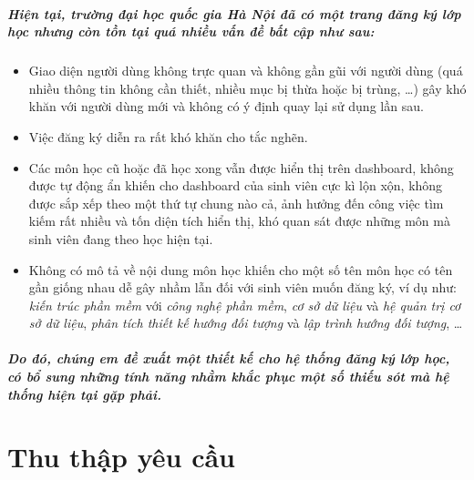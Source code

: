 \documentclass[12pt]{book}
\begin{document}
  \paragraph{\textnormal{Hiện tại, trường đại học quốc gia Hà Nội đã có một trang đăng ký lớp học nhưng còn tồn tại quá nhiều vấn đề bất cập như sau:}}
  \begin{itemize}
    \item Giao diện người dùng không trực quan và không gần gũi với người dùng (quá nhiều thông tin không cần thiết, nhiều mục bị thừa hoặc bị trùng, \ldots) gây khó khăn với người dùng mới và không có ý định quay lại sử dụng lần sau.
    \item Việc đăng ký diễn ra rất khó khăn cho tắc nghẽn.
    \item Các môn học cũ hoặc đã học xong vẫn được hiển thị trên dashboard, không được tự động ẩn khiến cho dashboard của sinh viên cực kì lộn xộn, không được sắp xếp theo một thứ tự chung nào cả, ảnh hưởng đến công việc tìm kiếm rất nhiều và tốn diện tích hiển thị, khó quan sát được những môn mà sinh viên đang theo học hiện tại.
    \item Không có mô tả về nội dung môn học khiến cho một số tên môn học có tên gần giống nhau dễ gây nhầm lẫn đối với sinh viên muốn đăng ký, ví dụ như: \textit{kiến trúc phần mềm} với \textit{công nghệ phần mềm}, \textit{cơ sở dữ liệu} và \textit{hệ quản trị cơ sở dữ liệu}, \textit{phân tích thiết kế hướng đối tượng} và \textit{lập trình hướng đối tượng}, \ldots
  \end{itemize}

  \paragraph{\textnormal{Do đó, chúng em đề xuất một thiết kế cho hệ thống đăng ký lớp học, có bổ sung những tính năng nhằm khắc phục một số thiếu sót mà hệ thống hiện tại gặp phải.}}

\chapter{Thu thập yêu cầu}
  
\end{document}
